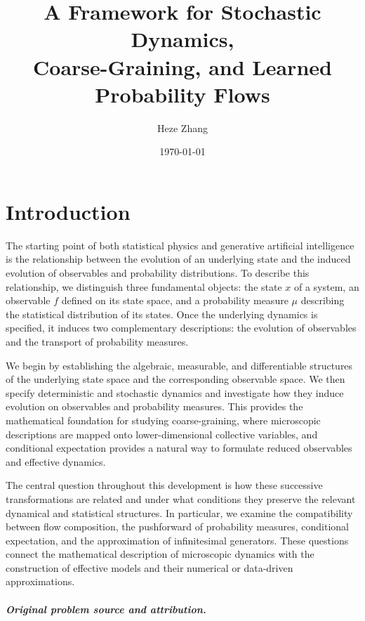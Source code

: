 \documentclass[12pt,a4paper,oneside]{book}
\title{\textbf{A Framework for Stochastic Dynamics,\\
Coarse-Graining, and Learned Probability Flows}}
\author{Heze Zhang}
\date{\today}
\begin{document}
\frontmatter
\maketitle
\begingroup
\small
{}
\tableofcontents
\endgroup
\clearpage
\chapter*{Introduction}

The starting point of both statistical physics and generative artificial intelligence is the relationship between the
evolution of an underlying state and the induced evolution of observables and probability distributions. To describe this
relationship, we distinguish three fundamental objects: the state $x$ of a system, an observable $f$ defined on its state
space, and a probability measure $\mu$ describing the statistical distribution of its states. Once the underlying dynamics
is specified, it induces two complementary descriptions: the evolution of observables and the transport of probability
measures.

We begin by establishing the algebraic, measurable, and differentiable structures of the underlying state space and the
corresponding observable space. We then specify deterministic and stochastic dynamics and investigate how they induce
evolution on observables and probability measures. This provides the mathematical foundation for studying coarse-graining,
where microscopic descriptions are mapped onto lower-dimensional collective variables, and conditional expectation provides
a natural way to formulate reduced observables and effective dynamics.

The central question throughout this development is how these successive transformations are related and under what conditions
they preserve the relevant dynamical and statistical structures. In particular, we examine the compatibility between flow
composition, the pushforward of probability measures, conditional expectation, and the approximation of infinitesimal
generators. These questions connect the mathematical description of microscopic dynamics with the construction of effective
models and their numerical or data-driven approximations.

\paragraph{Original problem source and attribution.}
\end{document}
